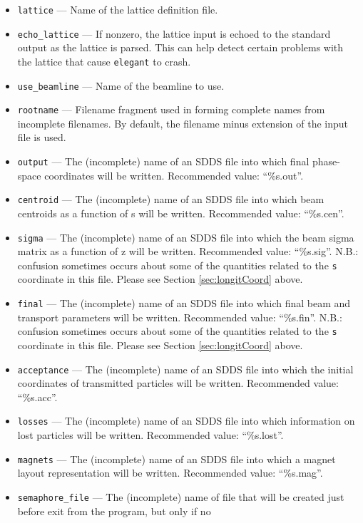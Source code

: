 \documentclass[11pt]{article}
\begin{document}
\begin{itemize}
\item \verb|lattice| --- Name of the lattice definition file.
\item \verb|echo_lattice| --- If nonzero, the lattice input is echoed to the
        standard output as the lattice is parsed.  This can help detect certain
        problems with the lattice that cause \verb|elegant| to crash.
\item \verb|use_beamline| --- Name of the beamline to use.
\item \verb|rootname| --- Filename fragment used in forming complete names from incomplete filenames.  By default, 
the filename minus extension of the input file is used.
\item \verb|output| --- The (incomplete) name of an SDDS file into which final phase-space coordinates
will be written.  Recommended value: ``\%s.out''.
\item \verb|centroid| --- The (incomplete) name of an SDDS file into which beam centroids as a function
of s will be written.   Recommended value: ``\%s.cen''.
\item \verb|sigma| --- The (incomplete) name of an SDDS file into
which the beam sigma matrix as a function of z will be written.
Recommended value: ``\%s.sig''.  N.B.: confusion sometimes occurs about some of the quantities related to
the {\tt s} coordinate in this file.  Please see Section \ref{sec:longitCoord} above.
\item \verb|final| --- The (incomplete) name of an SDDS file into
which final beam and transport parameters will be written. Recommended
value: ``\%s.fin''.   N.B.: confusion sometimes occurs about some of the quantities related to
the {\tt s} coordinate in this file.  Please see Section \ref{sec:longitCoord} above.
\item \verb|acceptance| --- The (incomplete) name of an SDDS file into
which the initial coordinates of transmitted particles will be
written.  Recommended value: ``\%s.acc''.
\item \verb|losses| --- The (incomplete) name of an SDDS file into
which information on lost particles will be written. Recommended
value: ``\%s.lost''.
\item \verb|magnets| --- The (incomplete) name of an SDDS file into
which a magnet layout representation will be written.  Recommended
value: ``\%s.mag''.
\item \verb|semaphore_file| --- The (incomplete) name of file that
will be created just before exit from the program, but only if no

\end{itemize}
\end{document}

